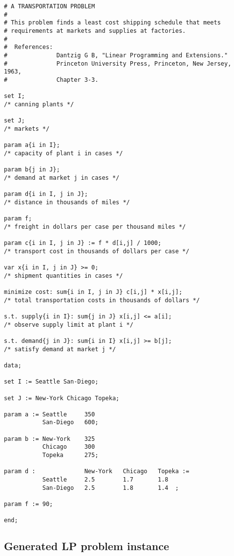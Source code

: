 \documentclass[10pt]{article}
\begin{document}
\begin{small}
\begin{verbatim}
# A TRANSPORTATION PROBLEM
#
# This problem finds a least cost shipping schedule that meets
# requirements at markets and supplies at factories.
#
#  References:
#              Dantzig G B, "Linear Programming and Extensions."
#              Princeton University Press, Princeton, New Jersey, 1963,
#              Chapter 3-3.

set I;
/* canning plants */

set J;
/* markets */

param a{i in I};
/* capacity of plant i in cases */

param b{j in J};
/* demand at market j in cases */

param d{i in I, j in J};
/* distance in thousands of miles */

param f;
/* freight in dollars per case per thousand miles */

param c{i in I, j in J} := f * d[i,j] / 1000;
/* transport cost in thousands of dollars per case */

var x{i in I, j in J} >= 0;
/* shipment quantities in cases */

minimize cost: sum{i in I, j in J} c[i,j] * x[i,j];
/* total transportation costs in thousands of dollars */

s.t. supply{i in I}: sum{j in J} x[i,j] <= a[i];
/* observe supply limit at plant i */

s.t. demand{j in J}: sum{i in I} x[i,j] >= b[j];
/* satisfy demand at market j */

data;

set I := Seattle San-Diego;

set J := New-York Chicago Topeka;

param a := Seattle     350
           San-Diego   600;

param b := New-York    325
           Chicago     300
           Topeka      275;

param d :              New-York   Chicago   Topeka :=
           Seattle     2.5        1.7       1.8
           San-Diego   2.5        1.8       1.4  ;

param f := 90;

end;
\end{verbatim}
\end{small}

\subsection{Generated LP problem instance}
\end{document}
